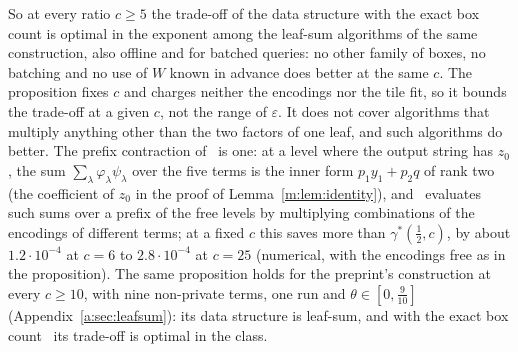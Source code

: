 \documentclass[11pt]{article}
\theoremstyle{definition}
\theoremstyle{remark}
\newcommand{\ShrPrefixGainLo}{1.2\cdot10^{-4}}%
\newcommand{\ShrPrefixGainHi}{2.8\cdot10^{-4}}%
\begin{document}
So at every ratio $c\ge5$ the trade-off of the data structure with the exact box count is optimal in the exponent among the leaf-sum algorithms of the same construction, also offline and for batched queries: no other family of boxes, no batching and no use of $W$ known in advance does better at the same $c$. The proposition fixes $c$ and charges neither the encodings nor the tile fit, so it bounds the trade-off at a given $c$, not the range of $\varepsilon$. It does not cover algorithms that multiply anything other than the two factors of one leaf, and such algorithms do better. The prefix contraction of~\cite{Shr26} is one: at a level where the output string has $z_0$, the sum $\sum_\lambda\varphi_\lambda\psi_\lambda$ over the five terms is the inner form $p_1y_1+p_2q$ of rank two (the coefficient of $z_0$ in the proof of Lemma~\ref{m:lem:identity}), and~\cite{Shr26} evaluates such sums over a prefix of the free levels by multiplying combinations of the encodings of different terms; at a fixed $c$ this saves more than $\gamma^*(\frac12,c)$, by about $\ShrPrefixGainLo$ at $c=6$ to $\ShrPrefixGainHi$ at $c=25$ (numerical, with the encodings free as in the proposition). The same proposition holds for the preprint's construction at every $c\ge10$, with nine non-private terms, one run and $\theta\in[0,\frac9{10}]$ (Appendix~\ref{a:sec:leafsum}): its data structure is leaf-sum, and with the exact box count~\cite[Theorem~2]{Shr26} its trade-off is optimal in the class.
\end{document}

